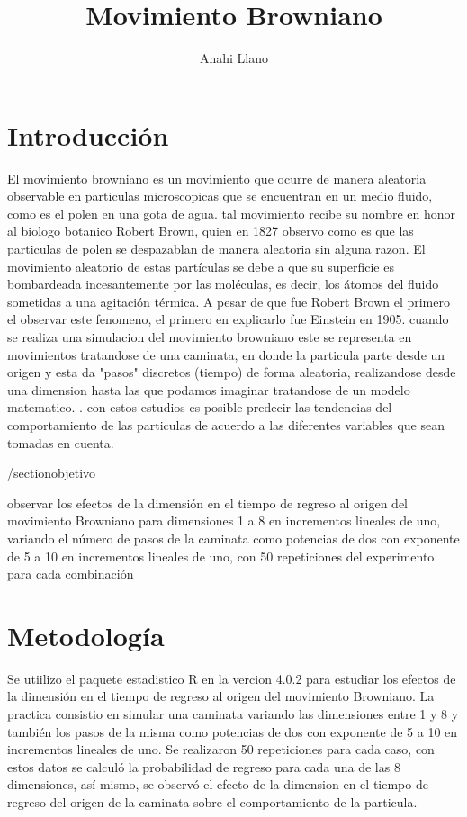 \documentclass{article}
\title { Movimiento Browniano}
\author{Anahi Llano}
\begin{document}
\maketitle

\section{Introducci\'on}\label{intro}

El movimiento browniano es un movimiento que ocurre de manera aleatoria observable en particulas microscopicas que se encuentran en un medio fluido, como es el polen en una gota de agua. tal movimiento recibe su nombre en honor al biologo botanico Robert Brown, quien en 1827 observo como es que las particulas de polen se despazablan de manera aleatoria sin alguna razon. El movimiento aleatorio de estas part\'iculas se debe a que su superficie es bombardeada incesantemente por las mol\'eculas, es decir, los \'atomos del fluido sometidas a una agitaci\'on t\'ermica. \citet{baz}
A pesar de que fue Robert Brown el primero el observar este fenomeno, el primero en explicarlo fue Einstein en 1905.
cuando se realiza una simulacion del movimiento browniano este se representa en movimientos tratandose de una caminata, en donde la particula parte desde un origen y esta da "pasos" discretos (tiempo) de forma aleatoria, realizandose desde una dimension hasta las que podamos imaginar tratandose de un modelo matematico. \citep{Eli}. con estos estudios es posible predecir las tendencias del comportamiento de las particulas de acuerdo a las diferentes variables que sean tomadas en cuenta.

/section{objetivo}\label{objec}

observar  los efectos de la dimensi\'on en el tiempo de regreso al origen del movimiento Browniano para dimensiones 1 a 8 en incrementos lineales de uno, variando el n\'umero de pasos de la caminata como potencias de dos con exponente de 5 a 10 en incrementos lineales de uno, con 50 repeticiones del experimento para cada combinaci\'on


\section{Metodolog\'ia}\label{met}

Se utiilizo el paquete estadistico R en la vercion 4.0.2 para estudiar los efectos de la dimensi\'on en el tiempo de regreso al origen del movimiento Browniano.
La practica consistio en simular una caminata variando las dimensiones entre 1 y 8 y tambi\'en los pasos de la misma como potencias de dos con exponente de 5 a 10 en incrementos lineales de uno.  Se realizaron 50 repeticiones para cada caso, con estos datos se
calcul\'o la probabilidad de regreso para cada una de las 8 dimensiones, as\'i mismo, se observ\'o el efecto de la dimension en el tiempo de regreso del origen de la caminata sobre el comportamiento de la particula.
\end{document}
